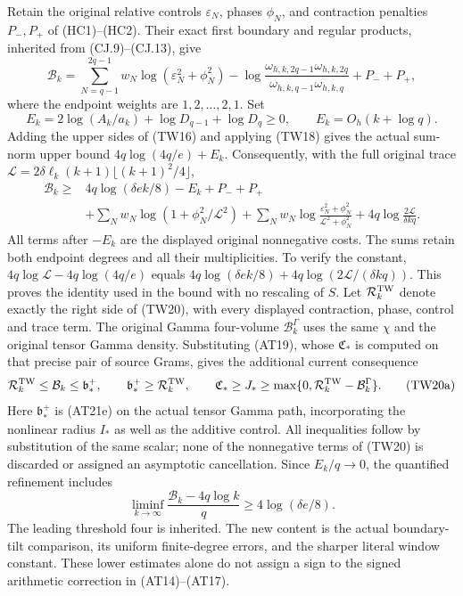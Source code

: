 Retain the original relative controls $\varepsilon_N$, phases $\phi_N$,
and contraction penalties $P_-,P_+$ of (HC1)--(HC2).  Their exact first
boundary and regular products, inherited from (CJ.9)--(CJ.13), give
\[
 \mathcal B_k=\sum_{N=q-1}^{2q-1}w_N
 \log(\varepsilon_N^2+\phi_N^2)
 -\log\frac{\omega_{h,k,2q-1}\omega_{h,k,2q}}
                {\omega_{h,k,q-1}\omega_{h,k,q}}+P_-+P_+,
\]
where the endpoint weights are $1,2,\ldots,2,1$.  Set
\[
 E_k=2\log(A_k/a_k)+\log D_{q-1}+\log D_q\geq0,
 \qquad E_k=O_h(k+\log q).
\]
Adding the upper sides of (TW16) and applying (TW18) gives the
actual sum-norm upper bound $4q\log(4q/e)+E_k$.
Consequently, with the full original trace
$\mathcal L=2\delta\ell_k(k+1)\lfloor(k+1)^2/4\rfloor$,
\[
 \begin{split}
 \mathcal B_k\geq{}&4q\log(\delta e k/8)-E_k+P_-+P_+\\
 &+\sum_Nw_N\log(1+\phi_N^2/\mathcal L^2)
 +\sum_Nw_N\log\frac{\varepsilon_N^2+\phi_N^2}
                           {\mathcal L^2+\phi_N^2}
 +4q\log\frac{2\mathcal L}{\delta kq}.
 \end{split}\tag{TW20}
\]
All terms after $-E_k$ are the displayed original nonnegative costs.
The sums retain both endpoint degrees and all their multiplicities.
To verify the constant, $4q\log\mathcal L-4q\log(4q/e)$ equals
$4q\log(\delta e k/8)+4q\log(2\mathcal L/(\delta kq))$.
This proves the identity used in the bound with no rescaling of $S$.
Let $\mathcal R_k^{\rm TW}$ denote exactly the right side of
(TW20), with every displayed contraction, phase, control and trace term.
The original Gamma four-volume $\mathcal B_k^\Gamma$ uses the
same $\chi$ and the original tensor Gamma density. Substituting
(AT19), whose $\mathfrak C_*$ is computed on that precise pair of
source Grams, gives the additional current consequence
\[
\mathcal R_k^{\rm TW}\le\mathcal B_k
 \le\mathfrak b_*^+,\qquad
\mathfrak b_*^+\ge\mathcal R_k^{\rm TW},\qquad
\mathfrak C_*\ge J_*\ge\max\{0,\mathcal R_k^{\rm TW}-\mathcal B_k^\Gamma\}.
\tag{TW20a}
\]
Here $\mathfrak b_*^+$ is (AT21e) on the actual tensor Gamma
path, incorporating the nonlinear radius $I_*$ as well as the
additive control. All inequalities follow by substitution of the same scalar;
none of the nonnegative terms of (TW20) is discarded or assigned
an asymptotic cancellation. Since $E_k/q\to0$, the quantified refinement includes
\[
 \liminf_{k\to\infty}
 \frac{\mathcal B_k-4q\log k}{q}
 \geq4\log(\delta e/8).
 \tag{TW21}
\]
The leading threshold four is inherited.  The new content is the
actual boundary-tilt comparison, its uniform finite-degree errors,
and the sharper literal window constant.  These lower estimates
alone do not assign a sign to the signed arithmetic correction in
(AT14)--(AT17).

